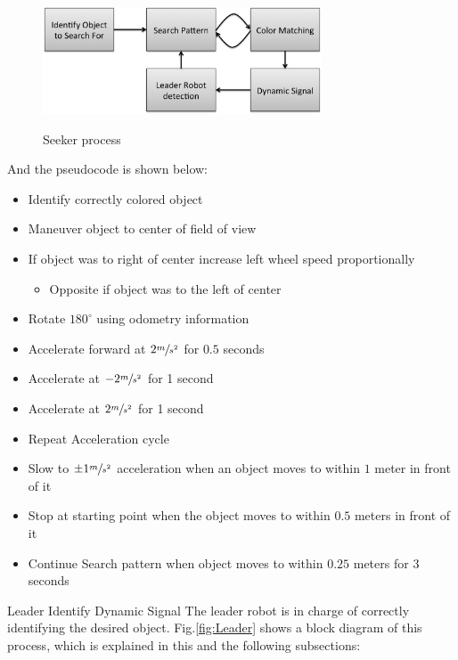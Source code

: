 \documentclass[conference]{IEEEtran}
\makeatletter
\renewcommand\subsection{\@startsection{subsection}{1}{\z@}
                                  {-2.0ex plus -1.5ex minus -0.5ex}
                                  {0.7ex plus 1ex minus 0ex}
                                  {\itshape\bfseries}}
\makeatother
\begin{document}
\begin{figure}[h]
	\centering
	\includegraphics[height=90pt]{images/Seeker_Block.png} 
	\label{fig:Seeker}
    \caption{Seeker process}
\end{figure}

And the pseudocode is shown below:
\medskip

\begin{itemize}
\item{Identify correctly colored object}
\item{Maneuver object to center of field of view}
\item{If object was to right of center increase left wheel speed proportionally
	\begin{itemize}
		\item{Opposite if object was to the left of center}
	\end{itemize} }
\item{Rotate $180^{\circ}$ using odometry information} 
\item{Accelerate forward at $2 \sfrac{m}{s^{2}}$ for $0.5$ seconds}
\item{Accelerate at $-2 \sfrac{m}{s^{2}}$ for 1 second}
\item{Accelerate at $2 \sfrac{m}{s^{2}}$ for 1 second}
\item{Repeat Acceleration cycle}
\item{Slow to $\pm1 \sfrac{m}{s^{2}}$ acceleration when an object moves to within $1$ meter in front of it}
\item{Stop at starting point when the object moves to within $0.5$ meters in front of it}
\item{Continue Search pattern when object moves to within $0.25$ meters for 3 seconds}
\end{itemize}

\subsection{Leader Identify Dynamic Signal}
\label{sec:LeaderIdentifyDynamicSignal}
The leader robot is in charge of correctly identifying 
the desired object. Fig.\ref{fig:Leader} shows a block
diagram of this process, which is explained in this and the
following subsections:
\end{document}
